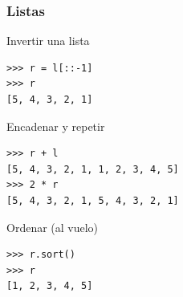 \documentclass[10pt,colorlinks]{beamer}
\begin{document}
\begin{frame}[fragile]\frametitle{Listas}
\vspace{-0.2cm}
\begin{block}{Invertir una lista}
\tiny
\begin{verbatim}
>>> r = l[::-1]
>>> r
[5, 4, 3, 2, 1]
\end{verbatim}

\end{block}
\vspace{-0.2cm}
\begin{block}{Encadenar y repetir}
\tiny
\begin{verbatim}
>>> r + l
[5, 4, 3, 2, 1, 1, 2, 3, 4, 5]
>>> 2 * r
[5, 4, 3, 2, 1, 5, 4, 3, 2, 1]
\end{verbatim}


\end{block}
\vspace{-0.2cm}
\begin{block}{Ordenar (al vuelo)}
\tiny
\begin{verbatim}
>>> r.sort()
>>> r
[1, 2, 3, 4, 5]
\end{verbatim}

\end{block}
\end{frame}
\end{document}
